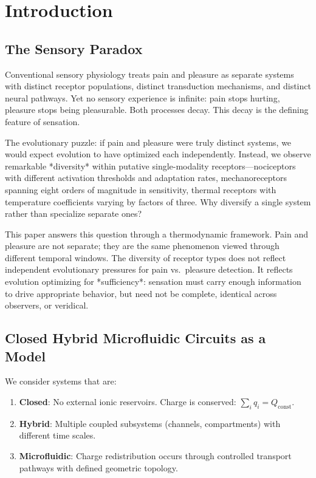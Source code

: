 \documentclass[twocolumn,10pt]{article}
\theoremstyle{remark}
\begin{document}
\section{Introduction}
\label{sec:intro}

\subsection{The Sensory Paradox}

Conventional sensory physiology treats pain and pleasure as separate systems with distinct receptor populations, distinct transduction mechanisms, and distinct neural pathways. Yet no sensory experience is infinite: pain stops hurting, pleasure stops being pleasurable. Both processes decay. This decay is the defining feature of sensation.

The evolutionary puzzle: if pain and pleasure were truly distinct systems, we would expect evolution to have optimized each independently. Instead, we observe remarkable *diversity* within putative single-modality receptors---nociceptors with different activation thresholds and adaptation rates, mechanoreceptors spanning eight orders of magnitude in sensitivity, thermal receptors with temperature coefficients varying by factors of three. Why diversify a single system rather than specialize separate ones?

This paper answers this question through a thermodynamic framework. Pain and pleasure are not separate; they are the same phenomenon viewed through different temporal windows. The diversity of receptor types does not reflect independent evolutionary pressures for pain vs.\ pleasure detection. It reflects evolution optimizing for *sufficiency*: sensation must carry enough information to drive appropriate behavior, but need not be complete, identical across observers, or veridical.

\subsection{Closed Hybrid Microfluidic Circuits as a Model}

We consider systems that are:
\begin{enumerate}[nosep]
  \item \textbf{Closed}: No external ionic reservoirs. Charge is conserved: $\sum_i q_i = Q_{\mathrm{const}}$.
  \item \textbf{Hybrid}: Multiple coupled subsystems (channels, compartments) with different time scales.
  \item \textbf{Microfluidic}: Charge redistribution occurs through controlled transport pathways with defined geometric topology.
\end{enumerate}
\end{document}
